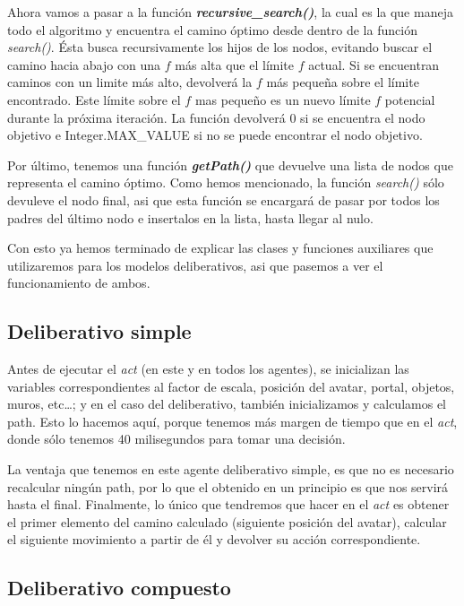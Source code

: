 \documentclass[11pt,a4paper]{article}
\begin{document}
Ahora vamos a pasar a la función \textbf{\textit{recursive\_search()}}, la cual es la que maneja todo
el algoritmo y encuentra el camino óptimo desde dentro de la función \textit{search()}. Ésta busca recursivamente
los hijos de los nodos, evitando buscar el camino hacia abajo con una $f$ más alta que el límite $f$ actual.
Si se encuentran caminos con un limite más alto, devolverá la $f$ más pequeña sobre el límite encontrado.
Este límite sobre el $f$ mas pequeño es un nuevo límite $f$ potencial durante la próxima iteración. La función
devolverá 0 si se encuentra el nodo objetivo e Integer.MAX\_VALUE si no se puede encontrar el nodo objetivo.

Por último, tenemos una función \textit{\textbf{getPath()}} que devuelve una lista de nodos que representa el
camino óptimo. Como hemos mencionado, la función \textit{search()} sólo devuleve el nodo final, asi que esta
función se encargará de pasar por todos los padres del último nodo e insertalos en la lista, hasta llegar al
nulo.

Con esto ya hemos terminado de explicar las clases y funciones auxiliares que utilizaremos para los modelos
deliberativos, asi que pasemos a ver el funcionamiento de ambos.


\subsection{Deliberativo simple}

Antes de ejecutar el \textit{act} (en este y en todos los agentes), se inicializan las variables correspondientes
al factor de escala, posición del avatar, portal, objetos, muros, etc\dots; y en el caso del deliberativo, también
inicializamos y calculamos el path. Esto lo hacemos aquí, porque tenemos más margen de tiempo que en el \textit{act},
donde sólo tenemos 40 milisegundos para tomar una decisión.

La ventaja que tenemos en este agente deliberativo simple, es que no es necesario recalcular ningún path, por
lo que el obtenido en un principio es que nos servirá hasta el final. Finalmente, lo único que tendremos que
hacer en el \textit{act} es obtener el primer elemento del camino calculado (siguiente posición del avatar),
calcular el siguiente movimiento a partir de él y devolver su acción correspondiente.


\subsection{Deliberativo compuesto}
\end{document}
